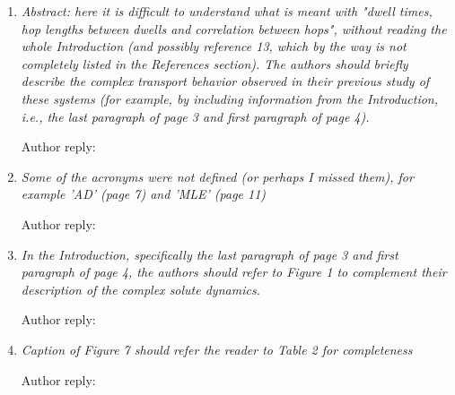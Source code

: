 \documentclass{article}
\begin{document}
\begin{enumerate}[label={Comment \theenumi :}, leftmargin=3.9\parindent]  

    \item \textit{ Abstract: here it is difficult to understand what is meant with "dwell times, hop 
    lengths between dwells and correlation between hops", without reading the whole Introduction (and 
    possibly reference 13, which by the way is not completely listed in the References section). The 
    authors should briefly describe the complex transport behavior observed in their previous study of
    these systems (for example, by including information from the Introduction, i.e., the last paragraph
    of page 3 and first paragraph of page 4).}
    
    Author reply:

    \item \textit{Some of the acronyms were not defined (or perhaps I missed them), for example 'AD' 
    (page 7) and 'MLE' (page 11)}
    
    Author reply:

    \item \textit{In the Introduction, specifically the last paragraph of page 3 and first paragraph
    of page 4, the authors should refer to Figure 1 to complement their description of the complex solute
    dynamics.}
    
    Author reply:

    \item \textit{Caption of Figure 7 should refer the reader to Table 2 for completeness}
    
    Author reply:

\end{enumerate}

%
%
\end{document}
